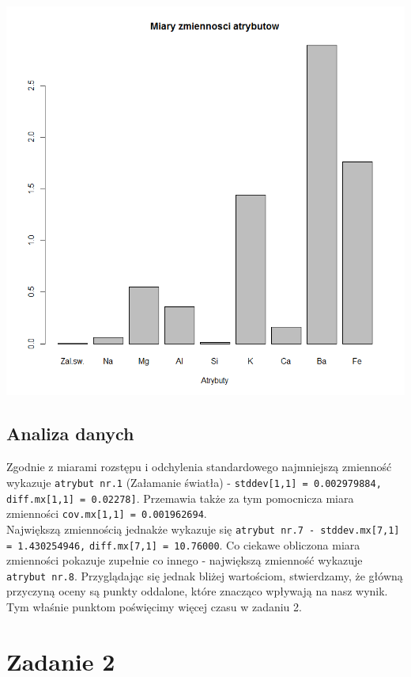\documentclass[a4paper,12pt,twoside]{article}
\begin{document}
\begin{center}
\includegraphics[width=.90\textwidth]{img/1_miary_zmiennosci.png}
\end{center}

\subsection{Analiza danych}

Zgodnie z miarami rozstępu i odchylenia standardowego najmniejszą zmienność wykazuje \texttt{atrybut nr.1}
(Załamanie światła) - \texttt{stddev[1,1] =  0.002979884, diff.mx[1,1] = 0.02278]}. Przemawia także za tym
pomocnicza miara zmienności \texttt{cov.mx[1,1] = 0.001962694}.\\

Największą zmiennością jednakże wykazuje się \texttt{atrybut nr.7 - stddev.mx[7,1] = 1.430254946,}
\texttt{diff.mx[7,1] = 10.76000}.
Co ciekawe obliczona miara zmienności pokazuje zupełnie co innego - największą zmienność wykazuje
\texttt{atrybut nr.8}. Przyglądając się jednak bliżej wartościom, stwierdzamy, że główną przyczyną oceny są
punkty oddalone, które znacząco wpływają na nasz wynik. Tym właśnie punktom poświęcimy więcej czasu w zadaniu 2.

\section{Zadanie 2}
\bigskip
\end{document}
